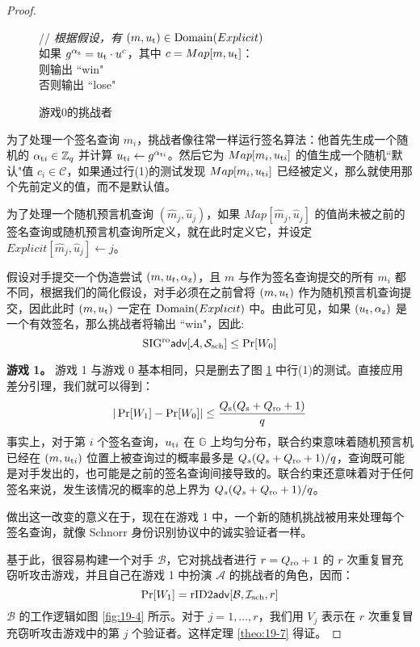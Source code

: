 \begin{proof}
\begin{figure}
  \hspace*{70pt} // \emph{根据假设，有 $(m,u_{\rm t})\in{\rm Domain}(Explicit)$}\\
  \hspace*{70pt} 如果 $g^{\alpha_{\rm z}}=u_{\rm t}\cdot u^c$，其中 $c=Map[m,u_{\rm t}]$：\\
  \hspace*{95pt} 则输出 ``win"\\
  \hspace*{95pt} 否则输出 ``lose"\\
  \caption{游戏0的挑战者}
  \label{fig:19-3}
\end{figure}

为了处理一个签名查询 $m_i$，挑战者像往常一样运行签名算法：他首先生成一个随机的 $\alpha_{{\rm t}i}\in\mathbb{Z}_q$ 并计算 $u_{{\rm t}i}\leftarrow g^{\alpha_{{\rm t}i}}$。然后它为 $Map[m_i,u_{{\rm t}i}]$ 的值生成一个随机``默认"值 $c_i\in\mathcal{C}$，如果通过行(1)的测试发现 $Map[m_i,u_{{\rm t}i}]$ 已经被定义，那么就使用那个先前定义的值，而不是默认值。

为了处理一个随机预言机查询 $(\widehat m_j,\widehat u_j)$，如果 $Map[\widehat m_j,\widehat u_j]$ 的值尚未被之前的签名查询或随机预言机查询所定义，就在此时定义它，并设定 $Explicit[\widehat m_j,\widehat u_j]\leftarrow j$。

假设对手提交一个伪造尝试 $(m,u_t,\alpha_{\rm z})$，且 $m$ 与作为签名查询提交的所有 $m_i$ 都不同，根据我们的简化假设，对手必须在之前曾将 $(m,u_{\rm t})$ 作为随机预言机查询提交，因此此时 $(m,u_{\rm t})$ 一定在 ${\rm Domain}(Explicit)$ 中。由此可见，如果 $(u_{\rm t},\alpha_{\rm z})$ 是一个有效签名，那么挑战者将输出 ``win"，因此:
$$
{\rm SIG^{ro}\mathsf{adv}}[\mathcal{A}, \mathcal{S}_{\rm sch}]\leq\Pr[W_0]
$$

\noindent
\textbf{游戏 1。}
游戏 1 与游戏 0 基本相同，只是删去了图 \ref{fig:19-3} 中行(1)的测试。直接应用差分引理，我们就可以得到：
$$
|\Pr[W_1]-\Pr[W_0]|\leq\frac{Q_{\rm s}(Q_{\rm s}+Q_{\rm ro}+1)}{q}
$$
事实上，对于第 $i$ 个签名查询，$u_{{\rm t}i}$ 在 $\mathbb{G}$ 上均匀分布，联合约束意味着随机预言机已经在 $(m,u_{{\rm t}i})$ 位置上被查询过的概率最多是 ${Q_s(Q_s+Q_{\rm ro}+1)}/{q}$，查询既可能是对手发出的，也可能是之前的签名查询间接导致的。联合约束还意味着对于任何签名来说，发生该情况的概率的总上界为 ${Q_s(Q_s+Q_{\rm ro}+1)}/{q}$。

做出这一改变的意义在于，现在在游戏 1 中，一个新的随机挑战被用来处理每个签名查询，就像 Schnorr 身份识别协议中的诚实验证者一样。

基于此，很容易构建一个对手 $\mathcal{B}$，它对挑战者进行 $r=Q_{\rm ro}+1$ 的 $r$ 次重复冒充窃听攻击游戏，并且自己在游戏 1 中扮演 $\mathcal{A}$ 的挑战者的角色，因而：
$$
\Pr[W_1] = {\rm rID2\mathsf{adv}}[\mathcal{B},\mathcal{I}_{\rm sch},r]
$$
$\mathcal{B}$ 的工作逻辑如图 \ref{fig:19-4} 所示。对于 $j=1,\dots,r$，我们用 $V_j$ 表示在 $r$ 次重复冒充窃听攻击游戏中的第 $j$ 个验证者。这样定理 \ref{theo:19-7} 得证。
\end{proof}

